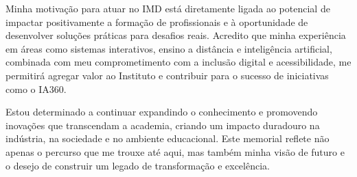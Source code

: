 \documentclass[10pt,a4paper,oneside]{book}
\begin{document}
Minha motivação para atuar no IMD está diretamente ligada ao potencial de impactar positivamente a formação de
profissionais e à oportunidade de desenvolver soluções práticas para desafios reais. Acredito que minha experiência
em áreas como sistemas interativos, ensino a distância e inteligência artificial, combinada com meu comprometimento
com a inclusão digital e acessibilidade, me permitirá agregar valor ao Instituto e contribuir para o sucesso de
iniciativas como o IA360.

Estou determinado a continuar expandindo o conhecimento e promovendo inovações que transcendam a academia, criando um
impacto duradouro na indústria, na sociedade e no ambiente educacional. Este memorial reflete não apenas o percurso
que me trouxe até aqui, mas também minha visão de futuro e o desejo de construir um legado de transformação e excelência.



\backmatter


\end{document}
